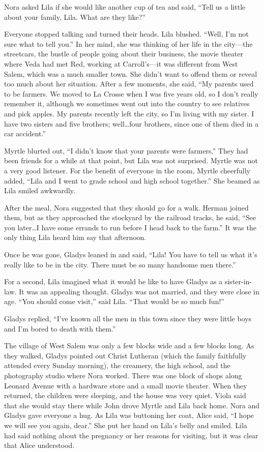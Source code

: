 \documentclass[
  american,
  letterpaper,
]{book}
\begin{document}
Nora asked Lila if she would like another cup of tea and said, ``Tell us
a little about your family, Lila. What are they like?''

Everyone stopped talking and turned their heads. Lila blushed. ``Well,
I'm not sure what to tell you.'' In her mind, she was thinking of her
life in the city---the streetcars, the bustle of people going about
their business, the movie theater where Veda had met Red, working at
Carroll's---it was different from West Salem, which was a much smaller
town. She didn't want to offend them or reveal too much about her
situation. After a few moments, she said, ``My parents used to be
farmers. We moved to La Crosse when I was five years old, so I don't
really remember it, although we sometimes went out into the country to
see relatives and pick apples. My parents recently left the city, so I'm
living with my sister. I have two sisters and five brothers;
well\ldots four brothers, since one of them died in a car accident.''

Myrtle blurted out, ``I didn't know that your parents were farmers.''
They had been friends for a while at that point, but Lila was not
surprised. Myrtle was not a very good listener. For the benefit of
everyone in the room, Myrtle cheerfully added, ``Lila and I went to
grade school and high school together.'' She beamed as Lila smiled
awkwardly.

After the meal, Nora suggested that they should go for a walk. Herman
joined them, but as they approached the stockyard by the railroad
tracks, he said, ``See you later\ldots I have some errands to run before
I head back to the farm.'' It was the only thing Lila heard him say that
afternoon.

Once he was gone, Gladys leaned in and said, ``Lila! You have to tell us
what it's really like to be in the city. There must be so many handsome
men there.''

For a second, Lila imagined what it would be like to have Gladys as a
sister-in-law. It was an appealing thought. Gladys was not married, and
they were close in age. ``You should come visit,'' said Lila. ``That
would be so much fun!''

Gladys replied, ``I've known all the men in this town since they were
little boys and I'm bored to death with them.''

The village of West Salem was only a few blocks wide and a few blocks
long. As they walked, Gladys pointed out Christ Lutheran (which the
family faithfully attended every Sunday morning), the creamery, the high
school, and the photography studio where Nora worked. There was one
block of shops along Leonard Avenue with a hardware store and a small
movie theater. When they returned, the children were sleeping, and the
house was very quiet. Viola said that she would stay there while John
drove Myrtle and Lila back home. Nora and Gladys gave everyone a hug. As
Lila was buttoning her coat, Alice said, ``I hope we will see you again,
dear.'' She put her hand on Lila's belly and smiled. Lila had said
nothing about the pregnancy or her reasons for visiting, but it was
clear that Alice understood.
\end{document}
